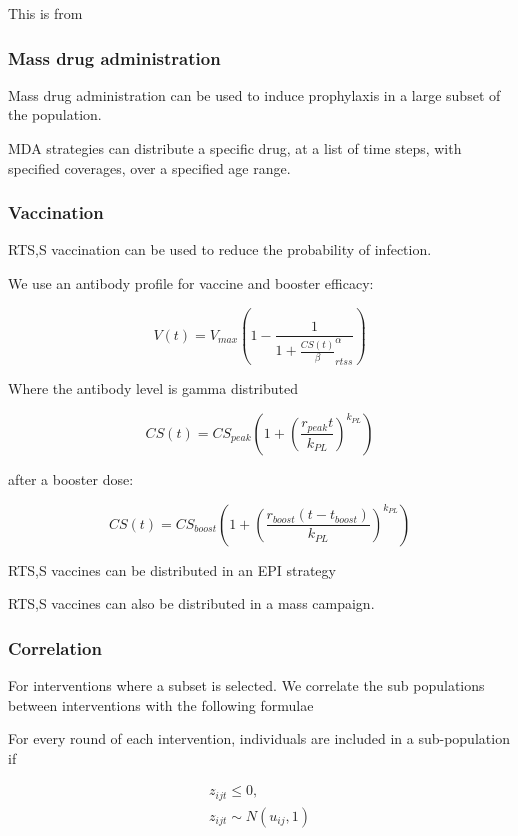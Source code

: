 \documentclass{bmcart}
\begin{document}
This is from \cite{okell_contrasting_2014}

\subsubsection*{Mass drug administration}

Mass drug administration can be used to induce prophylaxis in a large subset of the population.

MDA strategies can distribute a specific drug, at a list of time steps, with specified coverages, over a specified age range.

\subsubsection*{Vaccination}

RTS,S vaccination can be used to reduce the probability of infection.

We use an antibody profile for vaccine and booster efficacy:

\[
V(t) = V_{max}\left(1 - \frac{1}{1 + \frac{CS(t)}{\beta}^\alpha_{rtss}}\right)
\]

Where the antibody level is gamma distributed

\[
CS(t) = CS_{peak}\left(1 + \left(\frac{r_{peak}t}{k_{PL}}\right)^{k_{PL}}\right)
\]

after a booster dose:

\[
CS(t) = CS_{boost}\left(1 + \left(\frac{r_{boost}(t - t_{boost})}{k_{PL}}\right)^{k_{PL}}\right)
\]

RTS,S vaccines can be distributed in an EPI strategy %


RTS,S vaccines can also be distributed in a mass campaign.

\subsubsection*{Correlation}

For interventions where a subset is selected. We correlate the sub populations between interventions with the following formulae

For every round of each intervention, individuals are included in a sub-population if

\begin{gather*}
    z_{ijt} \leq 0, \\
    z_{ijt} \sim N(u_{ij}, 1)
\end{gather*}
\end{document}
